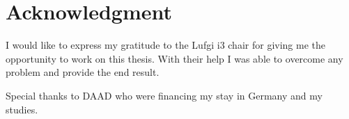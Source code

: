 \chapter*{Acknowledgment}
\thispagestyle{empty}

I would like to express my gratitude to the Lufgi i3 chair for giving me the opportunity to work on this thesis.
With their help I was able to overcome any problem and provide the end result.

Special thanks to DAAD who were financing my stay in Germany and my studies.


\vspace{1\baselineskip}
\hfill \textit{\AUTHOR}
